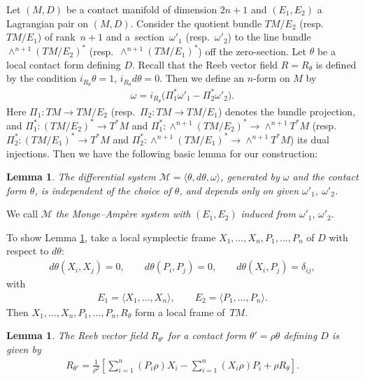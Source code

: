 \documentclass[pdftex]{sigma}
\newtheorem{Lem}[Th]{Lemma}
{ \theoremstyle{definition}
\newtheorem{Def}[Th]{Definition}
\newtheorem{Rem}[Th]{Remark}
\newtheorem{Ex}[Th]{Example}}
\begin{document}
Let $(M, D)$ be a contact manifold of dimension $2n+1$ and
$(E_1, E_2)$ a Lagrangian pair on $(M, D)$.
Consider the quotient bundle $TM/E_2$ (resp.~$TM/E_1$) of rank~$n+1$
and a~section~$\omega'_1$ (resp.~$\omega'_2$)
to the line bundle
$\wedge^{n+1}(TM/E_2)^*$ (resp.~$\wedge^{n+1}(TM/E_1)^*$) of\/f
the zero-section.
Let $\theta$ be a local contact form def\/ining $D$.
Recall that the Reeb vector f\/ield $R = R_{\theta}$ is def\/ined by the condition
$i_{R_\theta} \theta = 1$, $i_{R_\theta} d\theta = 0$.
Then we def\/ine an $n$-form on $M$ by
\begin{gather*}
\omega = i_{R_\theta} \big(\Pi_1^*\omega'_1 - \Pi_2^*\omega'_2\big).
\end{gather*}
Here $\Pi_1\colon TM \to TM/E_2$ (resp.\ $\Pi_2\colon TM \to TM/E_1$)
denotes the bundle projection, and
$\Pi_1^*\colon (TM/E_2)^* \to T^*M$ and $\Pi_1^*\colon \wedge^{n+1}(TM/E_2)^* \to
\wedge^{n+1}T^*M$
(resp.\ $\Pi_2^*\colon (TM/E_1)^* \to T^*M$ and $\Pi_2^*\colon
\wedge^{n+1}(TM/E_1)^* \to \wedge^{n+1}T^*M$)
its dual injections.
Then we have the following basic lemma for our construction:

\begin{Lem}
\label{MA-system construction}
The differential system $\mathcal{M} = \langle \theta, d\theta,
\omega \rangle$, generated by $\omega$ and the contact form $\theta$,
is independent of the choice of $\theta$,
and depends only on given $\omega'_1$, $\omega'_2$.
\end{Lem}

We call $\mathcal{M}$ {\it the Monge--Amp{\`e}re system with} $(E_1, E_2)$
{\it induced from} $\omega'_1$, $\omega'_2$.

To show Lemma \ref{MA-system construction},
take a local symplectic frame $X_1, \dots, X_n, P_1, \dots, P_n$
of $D$ with respect to $d\theta$:
\begin{gather*}
d\theta(X_i, X_j) = 0, \qquad d\theta(P_i, P_j) = 0, \qquad
d\theta(X_i, P_j) = \delta_{ij},
\end{gather*}
with
\begin{gather*}
E_1 = \langle X_1, \dots, X_n\rangle, \qquad
E_2 = \langle P_1, \dots, P_n\rangle.
\end{gather*}
Then $X_1, \dots, X_n, P_1, \dots, P_n, R_\theta$ form a local frame of~$TM$.

\begin{Lem}
\label{Reeb}
The Reeb vector field $R_{\theta'}$ for a contact form
$\theta' = \rho\theta$ defining $D$ is given by
\begin{gather*}
R_{\theta'} = \frac{1}{\rho^2}\left[
\sum_{i=1}^n (P_i\rho)X_i - \sum_{i=1}^n (X_i\rho)P_i + \rho R_{\theta}
\right].
\end{gather*}
\end{Lem}
\end{document}
